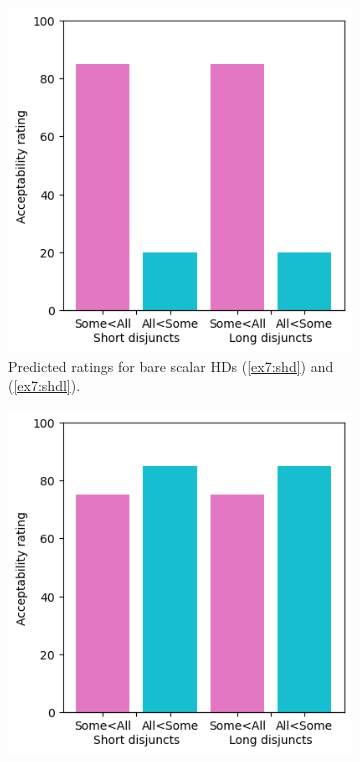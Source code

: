 \begin{figure}[H]
	\centering
	\begin{subfigure}[b]{.3\linewidth}
		\centering
		\includegraphics[width=\linewidth]{./pred-1b+2-noonly.png}
		\caption[]{Predicted ratings for bare scalar HDs (\ref{ex7:shd}) and (\ref{ex7:shdl}).}
	\end{subfigure}
	\hfill
	\begin{subfigure}[b]{.3\linewidth}
		\centering
		\includegraphics[width=\linewidth]{./pred-1b+2-only.png}

\end{subfigure}
\end{figure}
